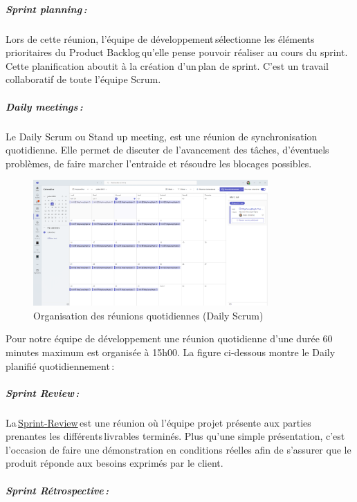 \documentclass[12pt,a4paper,twoside,openright]{report}
\begin{document}
\hypertarget{sprint-planning}{%
\subparagraph{Sprint planning\,:}\label{sprint-planning}}

Lors de cette réunion, l'équipe de développement\,sélectionne les
éléments prioritaires du Product Backlog\,qu'elle pense pouvoir réaliser
au cours du sprint. Cette planification aboutit à la création d'un\,plan
de sprint. C'est un travail collaboratif de toute l'équipe Scrum.~~

\hypertarget{daily-meetings}{%
\subparagraph{Daily meetings\,:}\label{daily-meetings}}

Le Daily Scrum ou Stand up meeting, est une réunion de synchronisation
quotidienne. Elle permet de discuter de l'avancement des tâches,
d'éventuels problèmes, de faire marcher l'entraide et résoudre les
blocages possibles.

\begin{figure}[H]
\centering
\includegraphics[width=0.8\textwidth]{latex_media/media/image9.png}
\caption{Organisation des réunions quotidiennes (Daily Scrum)}
\label{fig:daily-scrum}
\end{figure}

Pour
notre équipe de développement une réunion quotidienne d'une durée 60
minutes maximum est organisée à 15h00. La figure ci-dessous montre le
Daily planifié quotidiennement\,:~

\hypertarget{sprint-review}{%
\subparagraph{Sprint Review\,:}\label{sprint-review}}

La\,\href{https://www.appvizer.fr/magazine/operations/gestion-de-projet/sprint-review}{Sprint-Review}\,est
une réunion où l'équipe projet présente aux parties prenantes les
différents\,livrables terminés. Plus qu'une simple présentation, c'est
l'occasion de faire une démonstration en conditions réelles afin de
s'assurer que le produit réponde aux besoins exprimés par le client.~

\hypertarget{sprint-ruxe9trospective}{%
\subparagraph{Sprint Rétrospective\,:~}\label{sprint-ruxe9trospective}}
\end{document}
